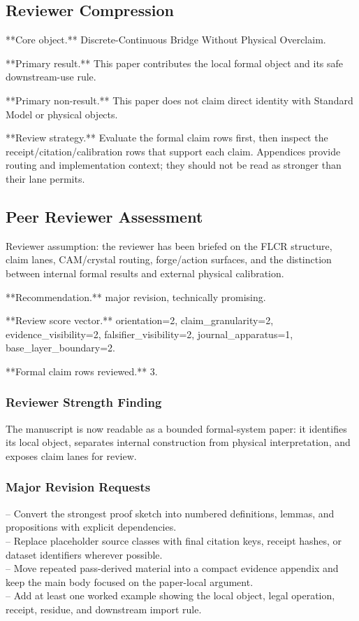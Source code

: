 \documentclass[11pt]{article}
\begin{document}
\subsection*{Reviewer Compression}

**Core object.** Discrete-Continuous Bridge Without Physical Overclaim.

**Primary result.** This paper contributes the local formal object and its safe downstream-use rule.

**Primary non-result.** This paper does not claim direct identity with Standard Model or physical objects.

**Review strategy.** Evaluate the formal claim rows first, then inspect the receipt/citation/calibration rows that support each claim. Appendices provide routing and implementation context; they should not be read as stronger than their lane permits.

\subsection*{Peer Reviewer Assessment}

Reviewer assumption: the reviewer has been briefed on the FLCR structure, claim lanes, CAM/crystal routing, forge/action surfaces, and the distinction between internal formal results and external physical calibration.

**Recommendation.** major revision, technically promising.

**Review score vector.** orientation=2, claim\_granularity=2, evidence\_visibility=2, falsifier\_visibility=2, journal\_apparatus=1, base\_layer\_boundary=2.

**Formal claim rows reviewed.** 3.

\subsubsection*{Reviewer Strength Finding}

The manuscript is now readable as a bounded formal-system paper: it identifies its local object, separates internal construction from physical interpretation, and exposes claim lanes for review.

\subsubsection*{Major Revision Requests}

\noindent{}-- Convert the strongest proof sketch into numbered definitions, lemmas, and propositions with explicit dependencies.\\
\noindent{}-- Replace placeholder source classes with final citation keys, receipt hashes, or dataset identifiers wherever possible.\\
\noindent{}-- Move repeated pass-derived material into a compact evidence appendix and keep the main body focused on the paper-local argument.\\
\noindent{}-- Add at least one worked example showing the local object, legal operation, receipt, residue, and downstream import rule.\\
\end{document}
